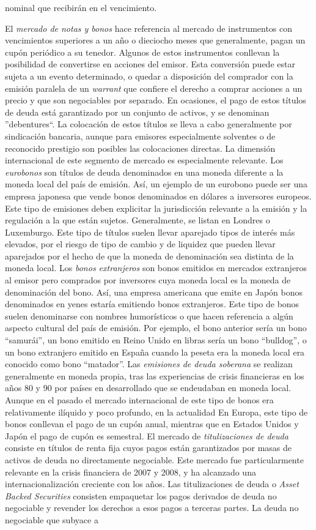 \documentclass{nuevotema}
\begin{document}
nominal que recibirán en el vencimiento.

El \textit{mercado de notas y bonos} hace referencia al mercado de instrumentos con vencimientos superiores a un año o dieciocho meses que generalmente, pagan un cupón periódico a su tenedor. Algunos de estos instrumentos conllevan la posibilidad de convertirse en acciones del emisor. Esta conversión puede estar sujeta a un evento determinado, o quedar a disposición del comprador con la emisión paralela de un \textit{warrant} que confiere el derecho a comprar acciones a un precio y que son negociables por separado. En ocasiones, el pago de estos títulos de deuda está garantizado por un conjunto de activos, y se denominan ''debentures``. La colocación de estos títulos se lleva a cabo generalmente por sindicación bancaria, aunque para emisores especialmente solventes o de reconocido prestigio son posibles las colocaciones directas. La dimensión internacional de este segmento de mercado es especialmente relevante. Los \textit{eurobonos} son títulos de deuda denominados en una moneda diferente a la moneda local del país de emisión. Así, un ejemplo de un eurobono puede ser una empresa japonesa que vende bonos denominados en dólares a inversores europeos. Este tipo de emisiones deben explicitar la jurisdicción relevante a la emisión y la regulación a la que están sujetos. Generalmente, se listan en Londres o Luxemburgo. Este tipo de títulos suelen llevar aparejado tipos de interés más elevados, por el riesgo de tipo de cambio y de liquidez que pueden llevar aparejados por el hecho de que la moneda de denominación sea distinta de la moneda local. Los \textit{bonos extranjeros} son bonos emitidos en mercados extranjeros al emisor pero comprados por inversores cuya moneda local es la moneda de denominación del bono. Así, una empresa americana que emite en Japón bonos denominados en yenes estaría emitiendo bonos extranjeros. Este tipo de bonos suelen denominarse con nombres humorísticos o que hacen referencia a algún aspecto cultural del país de emisión. Por ejemplo, el bono anterior sería un bono ``samurái'', un bono emitido en Reino Unido en libras sería un bono ``bulldog'', o un bono extranjero emitido en España cuando la peseta era la moneda local era conocido como bono ``matador''. Las \textit{emisiones de deuda soberana} se realizan generalmente en moneda propia, tras las experiencias de crisis financieras en los años 80 y 90 por países en desarrollado que se endeudaban en moneda local. Aunque en el pasado el mercado internacional de este tipo de bonos era relativamente ilíquido y poco profundo, en la actualidad En Europa, este tipo de bonos conllevan el pago de un cupón anual, mientras que en Estados Unidos y Japón el pago de cupón es semestral. El mercado de \textit{titulizaciones de deuda} consiste en títulos de renta fija cuyos pagos están garantizados por masas de activos de deuda no directamente negociable. Este mercado fue particularmente relevante en la crisis financiera de 2007 y 2008, y ha alcanzado una internacionalización creciente con los años. Las titulizaciones de deuda o \textit{Asset Backed Securities} consisten empaquetar los pagos derivados de deuda no negociable y revender los derechos a esos pagos a terceras partes. La deuda no negociable que subyace a 
\end{document}
